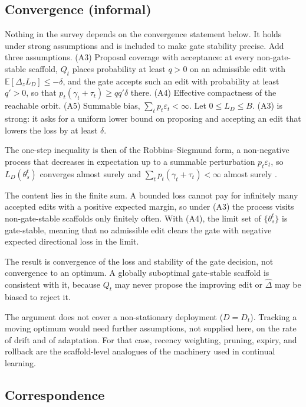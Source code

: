 \documentclass[
  11pt,
]{article}
\begin{document}
\subsection{Convergence (informal)}\label{convergence-informal}

Nothing in the survey depends on the convergence statement below. It holds under strong assumptions and is included to make gate stability precise. Add three assumptions. (A3) Proposal coverage with acceptance: at every non-gate-stable scaffold, \(Q_t\) places probability at least \(q > 0\) on an admissible edit with \(\mathbb{E}[\Delta_z L_D] \le -\delta\), and the gate accepts such an edit with probability at least \(q' > 0\), so that \(p_t(\gamma_t + \tau_t) \ge q q' \delta\) there. (A4) Effective compactness of the reachable orbit. (A5) Summable bias, \(\sum_t p_t \varepsilon_t < \infty\). Let \(0 \le L_D \le B\). (A3) is strong: it asks for a uniform lower bound on proposing and accepting an edit that lowers the loss by at least \(\delta\).

The one-step inequality is then of the Robbins--Siegmund form, a non-negative process that decreases in expectation up to a summable perturbation \(p_t \varepsilon_t\), so \(L_D(\theta_s^t)\) converges almost surely and \(\sum_t p_t(\gamma_t + \tau_t) < \infty\) almost surely \cite{robbins1971convergence}.

The content lies in the finite sum. A bounded loss cannot pay for infinitely many accepted edits with a positive expected margin, so under (A3) the process visits non-gate-stable scaffolds only finitely often. With (A4), the limit set of \(\{\theta_s^t\}\) is gate-stable, meaning that no admissible edit clears the gate with negative expected directional loss in the limit.

The result is convergence of the loss and stability of the gate decision, not convergence to an optimum. A globally suboptimal gate-stable scaffold is consistent with it, because \(Q_t\) may never propose the improving edit or \(\widehat{\Delta}\) may be biased to reject it.

The argument does not cover a non-stationary deployment (\(D = D_t\)). Tracking a moving optimum would need further assumptions, not supplied here, on the rate of drift and of adaptation. For that case, recency weighting, pruning, expiry, and rollback are the scaffold-level analogues of the machinery used in continual learning.

\subsection{Correspondence}\label{correspondence}
\end{document}
